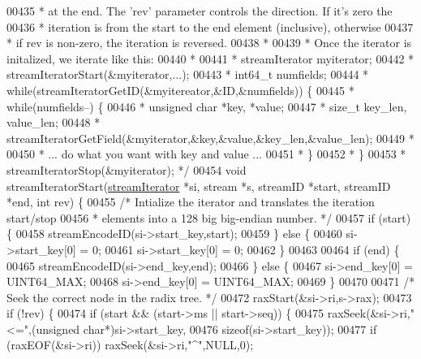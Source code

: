 \begin{DoxyCode}
{00435 \textcolor{comment}{ * at the end. The 'rev' parameter controls the direction. If it's zero the}
00436 \textcolor{comment}{ * iteration is from the start to the end element (inclusive), otherwise}
00437 \textcolor{comment}{ * if rev is non-zero, the iteration is reversed.}
00438 \textcolor{comment}{ *}
00439 \textcolor{comment}{ * Once the iterator is initalized, we iterate like this:}
00440 \textcolor{comment}{ *}
00441 \textcolor{comment}{ *  streamIterator myiterator;}
00442 \textcolor{comment}{ *  streamIteratorStart(&myiterator,...);}
00443 \textcolor{comment}{ *  int64\_t numfields;}
00444 \textcolor{comment}{ *  while(streamIteratorGetID(&myitereator,&ID,&numfields)) \{}
00445 \textcolor{comment}{ *      while(numfields--) \{}
00446 \textcolor{comment}{ *          unsigned char *key, *value;}
00447 \textcolor{comment}{ *          size\_t key\_len, value\_len;}
00448 \textcolor{comment}{ *          streamIteratorGetField(&myiterator,&key,&value,&key\_len,&value\_len);}
00449 \textcolor{comment}{ *}
00450 \textcolor{comment}{ *          ... do what you want with key and value ...}
00451 \textcolor{comment}{ *      \}}
00452 \textcolor{comment}{ *  \}}
00453 \textcolor{comment}{ *  streamIteratorStop(&myiterator); */}
00454 \textcolor{keywordtype}{void} streamIteratorStart(\hyperlink{structstreamIterator}{streamIterator} *si, stream *s, streamID *start, streamID *end, \textcolor{keywordtype}{
      int} rev) \{
00455     \textcolor{comment}{/* Intialize the iterator and translates the iteration start/stop}
00456 \textcolor{comment}{     * elements into a 128 big big-endian number. */}
00457     \textcolor{keywordflow}{if} (start) \{
00458         streamEncodeID(si->start\_key,start);
00459     \} \textcolor{keywordflow}{else} \{
00460         si->start\_key[0] = 0;
00461         si->start\_key[0] = 0;
00462     \}
00463 
00464     \textcolor{keywordflow}{if} (end) \{
00465         streamEncodeID(si->end\_key,end);
00466     \} \textcolor{keywordflow}{else} \{
00467         si->end\_key[0] = UINT64\_MAX;
00468         si->end\_key[0] = UINT64\_MAX;
00469     \}
00470 
00471     \textcolor{comment}{/* Seek the correct node in the radix tree. */}
00472     raxStart(&si->ri,s->rax);
00473     \textcolor{keywordflow}{if} (!rev) \{
00474         \textcolor{keywordflow}{if} (start && (start->ms || start->seq)) \{
00475             raxSeek(&si->ri,\textcolor{stringliteral}{"<="},(\textcolor{keywordtype}{unsigned} \textcolor{keywordtype}{char}*)si->start\_key,
00476                     \textcolor{keyword}{sizeof}(si->start\_key));
00477             \textcolor{keywordflow}{if} (raxEOF(&si->ri)) raxSeek(&si->ri,\textcolor{stringliteral}{"^"},NULL,0);
}
\end{DoxyCode}
